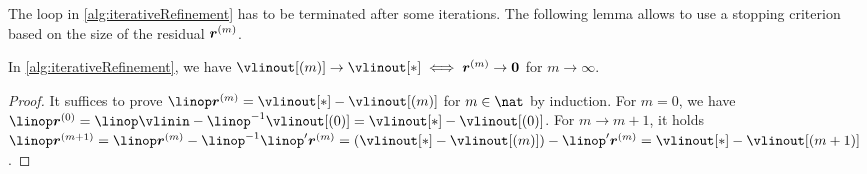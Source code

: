 \begin{algorithm}
  \begin{algorithmic}[1]
      \EndFor{}
    \EndFunction{}
  \end{algorithmic}
  \caption[%
    Iterative refinement%
  ]{%
    Application of a tensor product operator $\linop$
    on spatially adaptive sparse grids with iterative refinement,
    where $\linop'$ is an approximation of $\linop$.
    Inputs are the vector $\vlinin = (\linin{\*l,\*i})_{(\*l,\*i) \in \liset}$
    of input data (function values $\fcnval{\*l,\*i}$ at the grid points) and
    an initial solution $\vlinout[(0)]$.
    The output is the vector
    $\vlinout = (\linout{\*l,\*i})_{(\*l,\*i) \in \liset}$
    of output data (hierarchical surpluses $\surplus{\*l,\*i}$).%
  }%
  \label{alg:iterativeRefinement}%
\end{algorithm}

The loop in \cref{alg:iterativeRefinement} has to be terminated
after some iterations.
The following lemma allows to use a stopping criterion based on the
size of the residual ${\boldsymbol{r}}^{(m)}$.

\begin{shortlemma}
  \label{lemma:iterativeRefinementEquivalent}
  In \cref{alg:iterativeRefinement}, we have
  $\vlinout[(m)] \to \vlinout[\ast] \iff \*r^{(m)} \to \*0$ for
  $m \to \infty$.
\end{shortlemma}

\begin{proof}
  It suffices to prove $\linop \*r^{(m)} = \vlinout[\ast] - \vlinout[(m)]$
  for $m \in \nat$ by induction.
  For $m = 0$, we have
  $\linop \*r^{(0)}
  = \linop \vlinin - \linop^{-1} \vlinout[(0)]
  = \vlinout[\ast] - \vlinout[(0)]$.
  For $m \to m+1$, it holds
  $\linop \*r^{(m+1)}
  = \linop \*r^{(m)} - \linop^{-1} \linop' \*r^{(m)}
  = (\vlinout[\ast] - \vlinout[(m)]) - \linop' \*r^{(m)}
  = \vlinout[\ast] - \vlinout[(m+1)]$.
\end{proof}

